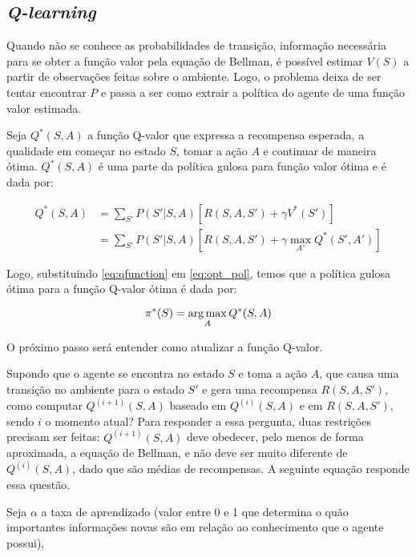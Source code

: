 \subsection{\textit{Q-learning}}
\label{sec:ql}

Quando não se conhece as probabilidades de transição, informação necessária para se obter a função valor pela equação de Bellman, é possível estimar $V(S)$ a partir de observações feitas sobre o ambiente. Logo, o problema deixa de ser tentar encontrar $P$ e passa a ser como extrair a política do agente de uma função valor estimada.

Seja $Q^{*}(S,A)$ a função Q-valor que expressa a recompensa esperada, a qualidade em começar no estado $S$, tomar a ação $A$ e continuar de maneira ótima. $Q^{*}(S,A)$ é uma parte da política gulosa para função valor ótima e é dada por:

\begin{equation} \label{eq:qfunction}
\begin{align*}
Q^{*}(S,A) &= \sum_{S'}P(S'|S,A)[R(S,A,S') + \gamma V^{*}(S')] \\
        &= \sum_{S'}P(S'|S,A)[R(S,A,S') + \gamma \max_{A'}Q^{*}(S',A')]
\end{align*}
\end{equation}

Logo, substituindo \ref{eq:qfunction} em \ref{eq:opt_pol}, temos que a política gulosa ótima para a função Q-valor ótima é dada por:

\begin{equation} \label{eq:q_opt_pol}
\pi^{*}(S) = \operatorname*{arg\,max}_{A}Q^{*}(S,A)
\end{equation}

O próximo passo será entender como atualizar a função Q-valor.

Supondo que o agente se encontra no estado $S$ e toma a ação $A$, que causa uma transição no ambiente para o estado $S'$ e gera uma recompensa $R(S,A,S')$, como computar $Q^{(i+1)}(S,A)$ baseado em $Q^{(i)}(S,A)$ e em $R(S,A,S')$, sendo $i$ o momento atual? Para responder a essa pergunta, duas restrições precisam ser feitas: $Q^{(i+1)}(S,A)$ deve obedecer, pelo menos de forma aproximada, a equação de Bellman, e não deve ser muito diferente de $Q^{(i)}(S,A)$, dado que são médias de recompensas. A seguinte equação responde essa questão.

Seja $\alpha$ a taxa de aprendizado (valor entre 0 e 1 que determina o quão importantes informações novas são em relação ao conhecimento que o agente possui),

